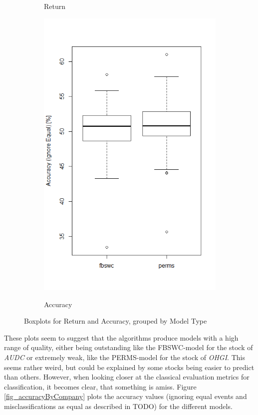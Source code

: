 \begin{figure}[h]
\begin{subfigure}{.5\textwidth}
  \label{fig_returnBoxplot}
  \caption{Return}
\end{subfigure}%
\begin{subfigure}{.5\textwidth}
  \centering
  \includegraphics[width=\linewidth]{boxplotAccuracy}
  \label{fig_accuracyBoxplot}
  \caption{Accuracy}
\end{subfigure}
\caption{Boxplots for Return and Accuracy, grouped by Model Type}
\label{fig_returnBoxplots}
\end{figure}

These plots seem to suggest that the algorithms produce models with a high range of quality, either being outstanding like the FBSWC-model for the stock of \textit{AUDC} or extremely weak, like the PERMS-model for the stock of \textit{OHGI}. This seems rather weird, but could be explained by some stocks being easier to predict than others. However, when looking closer at the classical evaluation metrics for classification, it becomes clear, that something is amiss. Figure \ref{fig_accuracyByCompany} plots the accuracy values (ignoring equal events and misclassifications as equal as described in TODO) for the different models. 

